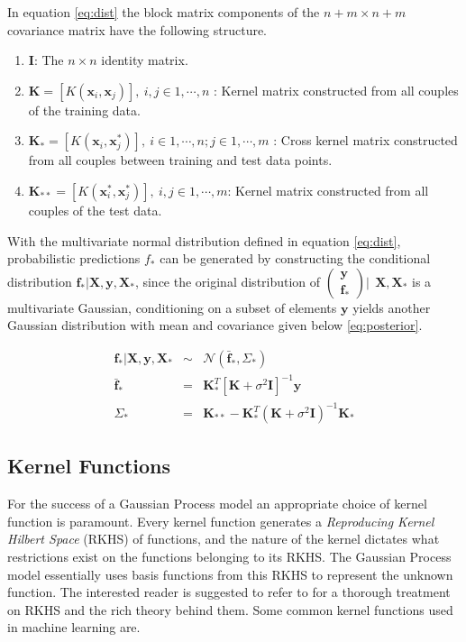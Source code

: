 \documentclass[referee,a4paper,12pt,traditabstract]{swsc}
\begin{document}
\begin{linenumbers}
In equation \ref{eq:dist} the block matrix components of the $n+m \times n+m$ covariance matrix have the following structure.

\begin{enumerate}
      \item $\mathbf{I}$: The $n \times n$ identity matrix.
      \item $\mathbf{K} = [K(\mathbf{x}_i, \mathbf{x}_j)], \ i,j \in 1,\cdots,n$ : Kernel matrix constructed from all couples of the training data.
      \item $\mathbf{K}_{*} = [K(\mathbf{x}_i, \mathbf{x}^{*}_j)], \ i \in 1,\cdots,n ; j \in 1,\cdots,m$ : Cross kernel matrix constructed from all couples between training and test data points.
      \item $\mathbf{K}_{**} = [K(\mathbf{x}^{*}_i, \mathbf{x}^{*}_j)], \ i,j \in 1,\cdots,m$: Kernel matrix constructed from all couples of the test data.
\end{enumerate}

With the multivariate normal distribution defined in equation \ref{eq:dist}, probabilistic predictions $f_*$ can be generated by constructing the conditional distribution $\mathbf{f_*}|\mathbf{X},\mathbf{y},\mathbf{X_*}$, since the original distribution of $\left( \begin{array}{c} \mathbf{y} \\ \mathbf{f_*} \end{array} \right) | \ \ \mathbf{X}, \mathbf{X}_*$ is a multivariate Gaussian, conditioning on a subset of elements $\mathbf{y}$ yields another Gaussian distribution with mean and covariance given below \ref{eq:posterior}.

\begin{eqnarray}
    \mathbf{f_*}|\mathbf{X},\mathbf{y},\mathbf{X_*} & \sim & \mathcal{N}(\mathbf{\bar{f}_*}, \Sigma_*)  \label{eq:posterior} \\
    \mathbf{\bar{f}_*} & = & \mathbf{K}^T_{*} [\mathbf{K} + \sigma^{2} \mathbf{I}]^{-1} \mathbf{y} \\
    \Sigma_* & = & \mathbf{K}_{**} - \mathbf{K}^T_{*} \left(\mathbf{K} + \sigma^{2} \mathbf{I}\right)^{-1} \mathbf{K}_{*}
\end{eqnarray}

\subsection{Kernel Functions}

For the success of a Gaussian Process model an appropriate choice of kernel function is paramount. Every kernel function generates a \emph{Reproducing Kernel Hilbert Space} (RKHS) of functions, and the nature of the kernel dictates what restrictions exist on the functions belonging to its RKHS. The Gaussian Process model essentially uses basis functions from this RKHS to represent the unknown function. The interested reader is suggested to refer to \cite{Berlinet2004} for a thorough treatment on RKHS and the rich theory behind them. Some common kernel functions used in machine learning are.


\end{linenumbers}
\end{document}
